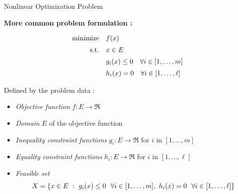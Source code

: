 \documentclass[9pt]{beamer}
\begin{document}
\begin{frame}{Nonlinear Optimization Problem}

  \textbf{More common problem formulation :}

  \vfill
  \[
    \begin{array}{rl}
      \operatorname{minimize} & f(x) \\[0.5em]
      \mathrm{s.t.}    & {x\in E} \\[0.5em]
             & g_i(x) \leq 0 \quad \forall i \in [1, \dots, m]\\[0.5em]
             & h_i(x) = 0 \quad \forall i \in [1, \dots, \ell]
    \end{array}
  \]
  \vfill
  
  Defined by the problem data :
  \begin{itemize}
  \item \emph{Objective function} $f:E\to\Re$
  \item \emph{Domain} $E$ of the objective function 
  \item \emph{Inequality constraint functions} $g_i : E\to\Re$ for $i$ in $[1, \dots, m]$
  \item \emph{Equality constraint functions} $h_i : E\to\Re$ for $i$ in $[1,\dots, \ell]$
  \item \emph{Feasible set}
    \[
      X = \left\{ x\in E\ : \ g_i(x) \leq 0 ~~\forall i \in [1, \dots, m],~h_i(x) = 0 ~~ \forall i \in [1, \dots, \ell]  \right\}
    \]
  \end{itemize}
  
  
\end{frame}
\end{document}
